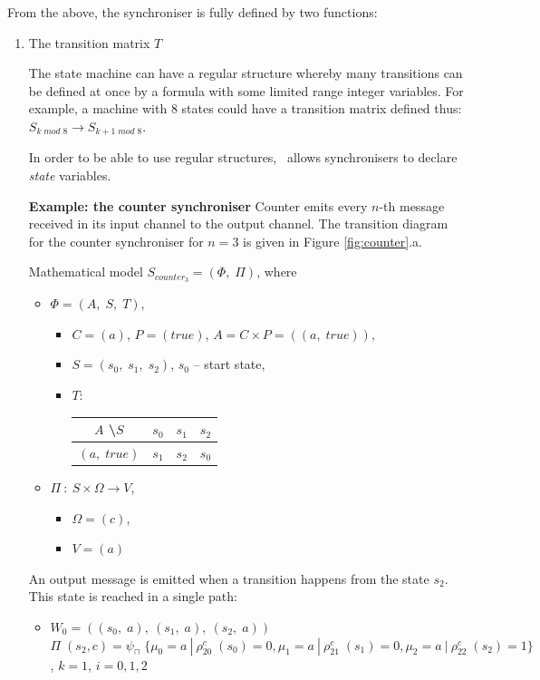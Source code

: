 From the above, the synchroniser is fully defined by two functions:
  \begin{enumerate}
  \item The transition matrix $T$

The state machine can have a regular structure whereby many transitions can be defined at once by a formula with some limited range integer variables. For example, a machine with 8 states could have a transition matrix defined thus: $S_{k \; mod \; 8} \to S_{k+1 \; mod \; 8}$.

In order to be able to use regular structures, \ak\ allows synchronisers to declare \emph{state} variables.

\textbf{Example: the counter synchroniser}  Counter emits every $n$-th message received in its input channel to the output channel. The transition diagram for the counter synchroniser for $n = 3$ is given in Figure \ref{fig:counter}.a.

Mathematical model $S_{counter_{3}} = (\Phi, \; \Pi)$, where
  \begin{itemize}
  \item[] $\Phi = (A, \; S, \; T)$,
    \begin{itemize}
    \item[] $C = (a)$, $P = (true)$, $A = C \times P = ((a, \; true))$,
    \item[] $S = (s_{0}, \; s_{1}, \; s_{2})$, $s_{0}$ -- start state,
    \item[] $T$:
      \begin{tabular}{c|c|c|c}
      $A$ \textbackslash $S$ & $s_{0}$ & $s_{1}$ & $s_{2}$\\
      \hline
      $(a, \; true)$ & $s_{1}$ & $s_{2}$ & $s_{0}$\\
      \end{tabular}
    \end{itemize}
  \item[] $\Pi \: : \: S \times \Omega \to V$,
    \begin{itemize}
    \item[] $\Omega = (c)$,
    \item[] $V = (a)$
    \end{itemize}
  \end{itemize}

An output message is emitted when a transition happens from the state $s_{2}$. This state is reached in a single path:
  \begin{itemize}
  \item[]
$W_{0} = ((s_{0}, \; a), \: (s_{1}, \; a), \: (s_{2}, \; a))$
$\Pi \; (s_{2}, c) = \psi_{\sqcap} \; \{\mu_{0} = a \: | \: \rho_{20}^{c} \; (s_{0}) = 0, \mu_{1} = a \: | \: \rho_{21}^{c} \; (s_{1}) = 0, \mu_{2} = a \: | \: \rho_{22}^{c} \; (s_{2}) = 1\}$, $k = 1$, $i = 0,1,2$ 
  \end{itemize}


\end{enumerate}
